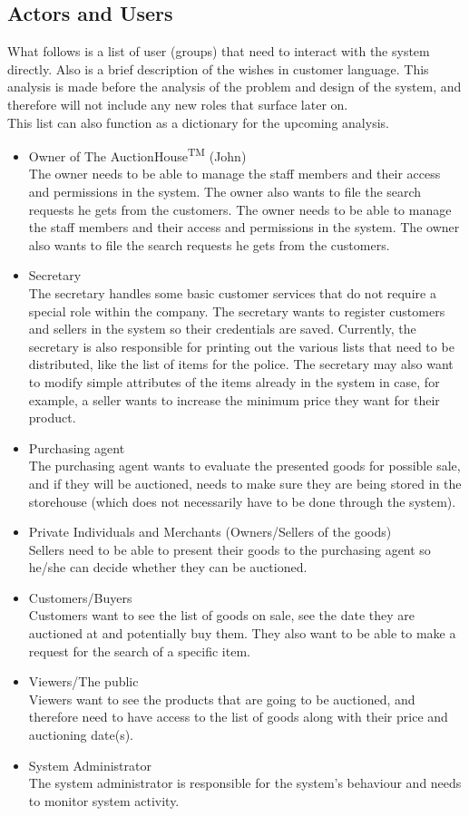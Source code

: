 \subsection{Actors and Users}
What follows is a list of user (groups) that need to interact with the system directly. Also is a brief description of the wishes in customer language. This analysis is made before the analysis of the problem and design of the system, and therefore will not include any new roles that surface later on.\\
This list can also function as a dictionary for the upcoming analysis.
\begin{itemize}[noitemsep]
	\item Owner of The AuctionHouse\textsuperscript{TM} (John)\\
		The owner needs to be able to manage the staff members and their access and permissions in the system. The owner also wants to file the search requests he gets from the customers.
		The owner needs to be able to manage the staff members and their access and permissions in the system. The owner also wants to file the search requests he gets from the customers.
	\item Secretary\\
		The secretary handles some basic customer services that do not require a special role within the company. The secretary wants to register customers and sellers in the system so their credentials are saved. Currently, the secretary is also responsible for printing out the various lists that need to be distributed, like the list of items for the police. The secretary may also want to modify simple attributes of the items already in the system in case, for example, a seller wants to increase the minimum price they want for their product.
	\item Purchasing agent\\
		The purchasing agent wants to evaluate the presented goods for possible sale, and if they will be auctioned, needs to make sure they are being stored in the storehouse (which does not necessarily have to be done through the system).
	\item Private Individuals and Merchants (Owners/Sellers of the goods)\\
		Sellers need to be able to present their goods to the purchasing agent so he/she can decide whether they can be auctioned.
	\item Customers/Buyers\\
		Customers want to see the list of goods on sale, see the date they are auctioned at and potentially buy them. They also want to be able to make a request for the search of a specific item.
	\item Viewers/The public\\
		Viewers want to see the products that are going to be auctioned, and therefore need to have access to the list of goods along with their price and auctioning date(s).
	\item System Administrator\\
		The system administrator is responsible for the system's behaviour and needs to monitor system activity.
\end{itemize}

